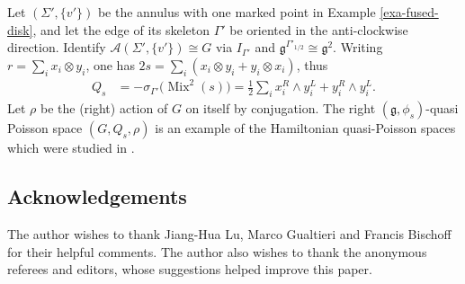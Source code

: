 \documentclass[pdftex]{sigma}
\numberwithin{equation}{section}
\def \g {\mathfrak{a}}
\def \g {\mathfrak{g}}
\def \A {{\mathcal{A}}}
\DeclareMathOperator{\Mix}{Mix}
\def \sGam {{\scriptscriptstyle \Gamma}}
\begin{document}
\begin{Example}Let $(\Sigma', \{v'\})$ be the annulus with one marked point in Example \ref{exa-fused-disk}, and let the edge of its skeleton $\Gamma'$ be oriented in the anti-clockwise direction. Identify $\A(\Sigma', \{v'\}) \cong G$ via $I_{\Gamma'}$ and $\g^{\Gamma'_{1/2}} \cong \g^2$. Writing $r = \sum_i x_i \otimes y_i$, one has $2s = \sum_i (x_i \otimes y_i + y_i \otimes x_i)$, thus
\begin{align*}
Q_s & =- \sigma_{\sGam'}\big(\Mix^2(s)\big) = \frac{1}{2} \sum_i x_i^R \wedge y_i^L + y_i^R \wedge y_i^L.
\end{align*}
Let $\rho$ be the (right) action of $G$ on itself by conjugation. The right $(\g, \phi_s)$-quasi Poisson space $(G, Q_s, \rho)$ is an example of the Hamiltonian quasi-Poisson spaces which were studied in \cite{AA}.
\end{Example}

\subsection*{Acknowledgements}

The author wishes to thank Jiang-Hua Lu, Marco Gualtieri and Francis Bischof\/f for their helpful comments. The author also wishes to thank the anonymous referees and editors, whose suggestions helped improve this paper.
\end{document}
